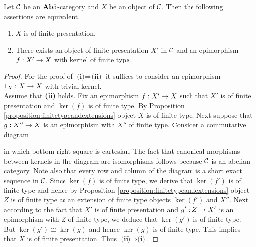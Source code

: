 \begin{proposition}\label{proposition:finitelypresentedinab5}
Let ${\mathcal C}$ be an $\mathbf{Ab}5$-category and $X$ be an object of ${\mathcal C}$. Then the following assertions are equivalent.
\begin{enumerate}[label=\emph{\textbf{(\roman*)}}, leftmargin=1.5em]
\item $X$ is of finite presentation.
\item There exists an object of finite presentation $X'$ in ${\mathcal C}$ and an epimorphism $f:X'\rightarrow X$ with kernel of finite type.
\end{enumerate} 
\end{proposition}
\begin{proof}
For the proof of $\textbf{(i)}\Rightarrow\textbf{(ii)}$ it suffices to consider an epimorphism $1_X:X\rightarrow X$ with trivial kernel.\\
Assume that \textbf{(ii)} holds. Fix an epimorphism $f:X'\rightarrow X$ such that $X'$ is of finite presentation and $\ker(f)$ is of finite type. By Proposition \ref{proposition:finitetypeandextensions} object $X$ is of finite type. Next suppose that $g:X''\rightarrow X$ is an epimorphism with $X''$ of finite type. Consider a commutative diagram
\begin{center}
\end{center}
in which bottom right square is cartesian. The fact that canonical morphisms between kernels in the diagram are isomorphisms follows because ${\mathcal C}$ is an abelian category. Note also that every row and column of the diagram is a short exact sequence in ${\mathcal C}$. Since $\ker(f)$ is of finite type, we derive that $\ker(f')$ is of finite type and hence by Proposition \ref{proposition:finitetypeandextensions} object $Z$ is of finite type as an extension of finite type objects $\ker(f')$ and $X''$. Next according to the fact that $X'$ is of finite presentation and $g':Z\rightarrow X'$ is an epimorphism with $Z$ of finite type, we deduce that $\ker(g')$ is of finite type. But $\ker(g')\cong \ker(g)$ and hence $\ker(g)$ is of finite type. This implies that $X$ is of finite presentation. Thus $\textbf{(ii)}\Rightarrow\textbf{(i)}$.
\end{proof}

